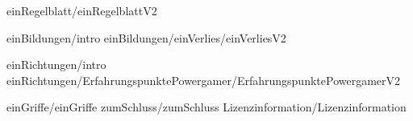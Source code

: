 
 {einRegelblatt/einRegelblattV2}

 {einBildungen/intro}
 {einBildungen/einVerlies/einVerliesV2}

 {einRichtungen/intro}
 {einRichtungen/ErfahrungspunktePowergamer/ErfahrungspunktePowergamerV2}

 {einGriffe/einGriffe}
 {zumSchluss/zumSchluss}
 {Lizenzinformation/Lizenzinformation}

